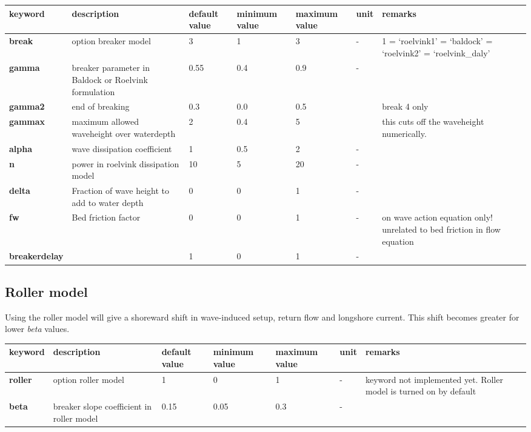 \begin{tabular}{|p{0.6in}|p{0.9in}|p{0.4in}|p{0.5in}|p{0.5in}|p{0.3in}|p{0.7in}|} \hline 
keyword & description & default value & minimum value & maximum value & unit & remarks \\ \hline 
\textbf{break     } & option breaker model & 3 & 1 & 3 & - & 1 = `roelvink1'\newline 2 = `baldock' \newline 3 = `roelvink2' \newline 4 = `roelvink\_daly'  \\ \hline 
\textbf{gamma } & breaker parameter in Baldock or Roelvink formulation & 0.55 & 0.4 & 0.9 & - &  \\ \hline 
\textbf{gamma2} & end of breaking  & 0.3 & 0.0 & 0.5 &  & break 4 only \\ \hline 
\textbf{gammax} & maximum allowed waveheight over waterdepth & 2 & 0.4 & 5 &  & this cuts off the waveheight numerically. \\ \hline 
\textbf{alpha } & wave dissipation coefficient & 1 & 0.5 & 2 & - &  \\ \hline 
\textbf{n    } & power in roelvink dissipation model & 10 & 5 & 20 & - &  \\ \hline 
\textbf{delta} & Fraction of wave height to add to water depth & 0 & 0 & 1 & - &  \\ \hline 
\textbf{fw} & Bed friction factor  & 0 & 0 & 1 & - & on wave action equation only! unrelated to bed friction in flow equation \\ \hline 
\textbf{breakerdelay} &  & 1 & 0 & 1 & - &  \\ \hline 
\end{tabular}


\subsection{ Roller model}

Using the roller model will give a shoreward shift in wave-induced setup, return flow and longshore current. This shift becomes greater for lower \textit{beta} values.

\begin{tabular}{|p{0.5in}|p{1.1in}|p{0.4in}|p{0.5in}|p{0.5in}|p{0.3in}|p{0.7in}|} \hline 
keyword & description & default value & minimum value & maximum value & unit & remarks \\ \hline 
\textbf{roller    } & option roller model & 1 & 0 & 1 & - & keyword not implemented yet. Roller model is turned on by default \\ \hline 
\textbf{beta     } & breaker slope coefficient in roller model & 0.15 & 0.05 & 0.3 & - &  \\ \hline 
\end{tabular}
